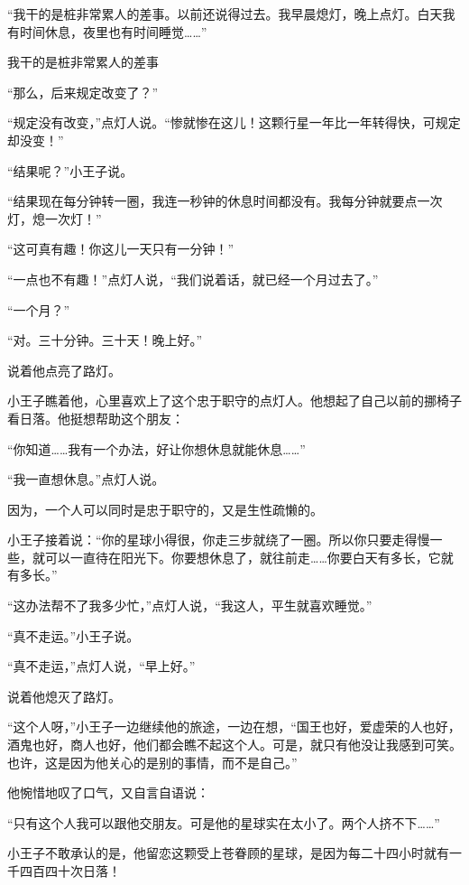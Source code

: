 “我干的是桩非常累人的差事。以前还说得过去。我早晨熄灯，晚上点灯。白天我有时间休息，夜里也有时间睡觉\ldots{}\ldots{}”

{\startalignment[center]
 \stopalignment}

我干的是桩非常累人的差事

“那么，后来规定改变了？”

“规定没有改变，”点灯人说。“惨就惨在这儿！这颗行星一年比一年转得快，可规定却没变！”

“结果呢？”小王子说。

“结果现在每分钟转一圈，我连一秒钟的休息时间都没有。我每分钟就要点一次灯，熄一次灯！”

“这可真有趣！你这儿一天只有一分钟！”

“一点也不有趣！”点灯人说，“我们说着话，就已经一个月过去了。”

“一个月？”

“对。三十分钟。三十天！晚上好。”

说着他点亮了路灯。

小王子瞧着他，心里喜欢上了这个忠于职守的点灯人。他想起了自己以前的挪椅子看日落。他挺想帮助这个朋友：

“你知道\ldots{}\ldots{}我有一个办法，好让你想休息就能休息\ldots{}\ldots{}”

“我一直想休息。”点灯人说。

因为，一个人可以同时是忠于职守的，又是生性疏懒的。

小王子接着说：“你的星球小得很，你走三步就绕了一圈。所以你只要走得慢一些，就可以一直待在阳光下。你要想休息了，就往前走\ldots{}\ldots{}你要白天有多长，它就有多长。”

“这办法帮不了我多少忙，”点灯人说，“我这人，平生就喜欢睡觉。”

“真不走运。”小王子说。

“真不走运，”点灯人说，“早上好。”

说着他熄灭了路灯。

“这个人呀，”小王子一边继续他的旅途，一边在想，“国王也好，爱虚荣的人也好，酒鬼也好，商人也好，他们都会瞧不起这个人。可是，就只有他没让我感到可笑。也许，这是因为他关心的是别的事情，而不是自己。”

他惋惜地叹了口气，又自言自语说：

“只有这个人我可以跟他交朋友。可是他的星球实在太小了。两个人挤不下\ldots{}\ldots{}”

小王子不敢承认的是，他留恋这颗受上苍眷顾的星球，是因为每二十四小时就有一千四百四十次日落！

